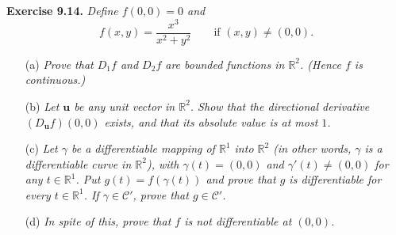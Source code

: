 \documentclass{article}
\begin{document}
\textbf{Exercise 9.14.}
\emph{Define $f(0,0) = 0$ and}
\[
  f(x,y) = \frac{x^3}{x^2 + y^2}
  \qquad \text{if }
  (x,y) \neq (0,0).
\]
\begin{enumerate}
\item[(a)]
  \emph{Prove that $D_1 f$ and $D_2 f$ are bounded functions in $\mathbb{R}^2$.
  (Hence $f$ is continuous.)}

\item[(b)]
  \emph{Let $\mathbf{u}$ be any unit vector in $\mathbb{R}^2$.
  Show that the directional derivative
  $(D_{\mathbf{u}}f)(0,0)$ exists, and that its absolute value is at most $1$.}

\item[(c)]
  \emph{Let $\gamma$ be a differentiable mapping of $\mathbb{R}^1$ into $\mathbb{R}^2$
  (in other words, $\gamma$ is a differentiable curve in $\mathbb{R}^2$),
  with $\gamma(t) = (0,0)$ and $\gamma'(t) \neq (0,0)$ for any $t \in \mathbb{R}^1$.
  Put $g(t) = f(\gamma(t))$ and prove that
  $g$ is differentiable for every $t \in \mathbb{R}^1$.
  If $\gamma \in \mathscr{C}'$, prove that $g \in \mathscr{C}'$.}

\item[(d)]
  \emph{In spite of this, prove that $f$ is not differentiable at $(0,0)$.} \\

\end{enumerate}
\end{document}
